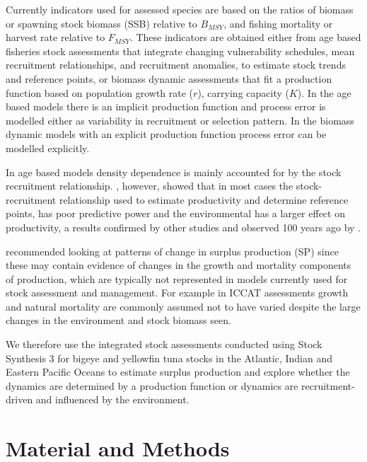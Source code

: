 \documentclass[12pt,doublespacing,a4paper]{ouparticle}
\begin{document}
Currently indicators used for assessed species are based on the ratios of biomass or spawning stock biomass (SSB) relative to $B_{MSY}$, and fishing mortality or harvest rate relative to $F_{MSY}$. These indicators are obtained either from age based fisheries stock assessments that integrate changing vulnerability schedules, mean recruitment relationships, and recruitment anomalies, to estimate stock trends and reference points, or biomass dynamic assessments that fit a production function based on population growth rate ($r$), carrying capacity ($K$). In the age based models there is an implicit production function and process error is modelled either as variability in recruitment or selection pattern. In the biomass dynamic models with an explicit production function process error can be modelled explicitly.  

In age based models density dependence is mainly accounted for by the stock recruitment relationship. 
\cite{cury2014resolving}, however, showed that in most cases the stock-recruitment relationship used to estimate productivity and determine reference points, has poor predictive power and the environmental has a larger effect on productivity, a results confirmed by other studies \citep[e.g.][]{szuwalski2014examining} and observed 100 years ago by \cite{hjort1914fluctuations}.

\cite{hilborn2001calculation} recommended looking at patterns of change in surplus production (SP) since these may contain evidence of changes in the growth and mortality components of production, which are typically not represented in models currently used for stock assessment and management. For example in ICCAT assessments growth and natural mortality are commonly assumed not to have varied despite the large changes in the environment and stock biomass seen.


We therefore use the integrated stock assessments conducted using Stock Synthesis 3 \cite[SS3]{methot2005technical} for bigeye and yellowfin tuna stocks in the Atlantic, Indian and Eastern Pacific Oceans to estimate surplus production and explore whether the dynamics are determined by a production function or dynamics are recruitment-driven and influenced by the environment.

\section{Material and Methods}
\end{document}
